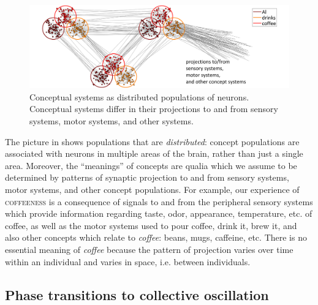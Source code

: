   
\begin{figure}
\includegraphics[width=\textwidth]{figures/Tilsen-img9.png}
\caption{Conceptual systems as distributed populations of neurons. Conceptual systems differ in their projections to and from sensory systems, motor systems, and other systems.}
\label{fig:2:2}
\end{figure}
 

  The picture in {} shows populations that are \textit{distributed}: concept populations are associated with neurons in multiple areas of the brain, rather than just a single area. Moreover, the “meanings” of concepts are qualia which we assume to be determined by patterns of synaptic projection to and from sensory systems, motor systems, and other concept populations. For example, our experience of \textsc{coffeeness} is a consequence of signals to and from the peripheral sensory systems which provide information regarding taste, odor, appearance, temperature, etc. of coffee, as well as the motor systems used to pour coffee, drink it, brew it, and also other concepts which relate to \textit{coffee}: beans, mugs, caffeine, etc. There is no essential meaning of \textit{coffee} because the pattern of projection varies over time within an individual and varies in space, i.e. between individuals.
\subsection{Phase transitions to collective oscillation}

